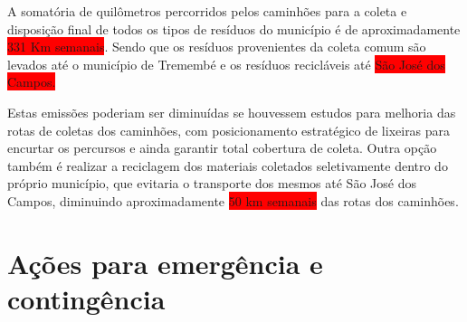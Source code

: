 	A somatória de quilômetros percorridos pelos caminhões para a coleta e disposição final de todos os tipos de resíduos do município é de aproximadamente \colorbox{red}{331 Km semanais}. Sendo que os resíduos provenientes da coleta comum são levados até o município de Tremembé e os resíduos recicláveis até \colorbox{red}{São José dos Campos.} 
	
	Estas emissões poderiam ser diminuídas se houvessem estudos para melhoria das rotas de coletas dos caminhões, com posicionamento estratégico de lixeiras para encurtar os percursos e ainda garantir total cobertura de coleta. 
	Outra opção também é realizar a reciclagem dos materiais coletados seletivamente dentro do próprio município, que evitaria o transporte dos mesmos até São José dos Campos, diminuindo aproximadamente \colorbox{red}{50 km semanais} das rotas dos caminhões.
	
	\section{Ações para emergência e contingência}
	
